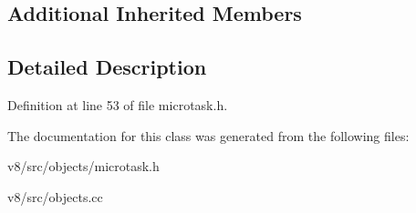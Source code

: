 \subsection*{Additional Inherited Members}


\subsection{Detailed Description}


Definition at line 53 of file microtask.\+h.



The documentation for this class was generated from the following files\+:\begin{DoxyCompactItemize}
\item 
v8/src/objects/microtask.\+h\item 
v8/src/objects.\+cc\end{DoxyCompactItemize}
